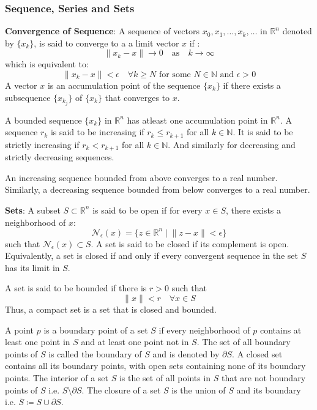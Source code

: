 \subsubsection{Sequence, Series and Sets} 

\textbf{Convergence of Sequence}: A sequence of vectors \(x_0,x_1, \dots , x_k, \dots\) 
in \(\mathbb{R}^n\) denoted by \(\{x_k\}\), is said to converge to a a limit vector \(x\) if :
\[
    \lVert x_k - x \rVert \to 0 \quad \text{as} \quad k \to \infty
\]
which is equivalent to:
\[
    \lVert x_k - x \rVert < \epsilon \quad \forall k \geq N \text{ for some } 
    N \in \mathbb{N} \text{ and } \epsilon > 0
\] 
A vector \(x\) is an accumulation point of the sequence \(\{x_k\}\) if there exists a subsequence
\(\{x_{k_j}\}\) of \(\{x_k\}\) that converges to \(x\).

A bounded sequence \(\{x_k\}\) in \(\mathbb{R}^n\) has atleast one accumulation point in \(\mathbb{R}^n\).
A sequence \(r_k\) is said to be increasing if \(r_k \leq r_{k+1}\) for all \(k \in \mathbb{N}\).
It is said to be strictly increasing if \(r_k < r_{k+1}\) for all \(k \in \mathbb{N}\). And similarly
for decreasing and strictly decreasing sequences.

An increasing sequence bounded from above converges to a real number. Similarly, a decreasing sequence
bounded from below converges to a real number.


\textbf{Sets}: A subset \(S \subset \mathbb{R}^n\) is said to be open if for every \(x \in S\), there exists
a neighborhood of \(x\):
\[
    \mathcal{N}_\epsilon(x) = \{z \in \mathbb{R}^n \mid \lVert z - x \rVert < \epsilon\}  
\] 
such that \(\mathcal{N}_\epsilon(x) \subset S\). A set is said to be closed if its complement is open.
Equivalently, a set is closed if and only if every convergent sequence in the set \(S\)
has its limit in \(S\).

A set is said to be bounded if there is \(r>0\) such that
\[
    \lVert x \rVert < r \quad \forall x \in S
\]
Thus, a compact set is a set that is closed and bounded.

A point \(p\) is a boundary point of a set \(S\) if every neighborhood of \(p\) contains at least one
point in \(S\) and at least one point not in \(S\). The set of all boundary points of \(S\) is called
the boundary of \(S\) and is denoted by \(\partial S\). A closed set contains all its boundary points,
with open sets containing none of its boundary points. The interior of a set \(S\) is the set of all
points in \(S\) that are not boundary points of \(S\) i.e. \(S \setminus \partial S\).
The closure of a set \(S\) is the union of \(S\) and its boundary i.e. \(\overline{S} \coloneqq S \cup \partial S\). 

